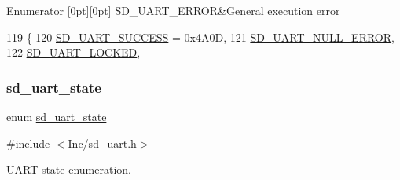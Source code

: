 \begin{DoxyEnumFields}{Enumerator}
[0pt][0pt]{}\mbox{\label{group___s_d___u_a_r_t___types_ggaff649a266fb34035c10733370c4fd104ad77d98472c0c3bb192d745b3389de08d}} 
S\+D\+\_\+\+U\+A\+R\+T\+\_\+\+E\+R\+R\+OR&General execution error \\
\hline

\end{DoxyEnumFields}

\begin{DoxyCode}
119                  \{
120     \mbox{\hyperlink{group___s_d___u_a_r_t___types_ggaff649a266fb34035c10733370c4fd104a3b6fe085405a5d58c55226fd59f01994}{SD\_UART\_SUCCESS}} = 0x4A0D,        
121     \mbox{\hyperlink{group___s_d___u_a_r_t___types_ggaff649a266fb34035c10733370c4fd104a5c517833fd066aef16573f7c2b2074d7}{SD\_UART\_NULL\_ERROR}},           
122     \mbox{\hyperlink{group___s_d___u_a_r_t___types_ggaff649a266fb34035c10733370c4fd104a81ad9d26004338f6c20d9a1ed5232662}{SD\_UART\_LOCKED}},               
\end{DoxyCode}
\mbox{\label{group___s_d___u_a_r_t___types_gaf0b8536f812b898a674880b74843b6da}} 
\subsubsection{\texorpdfstring{sd\+\_\+uart\+\_\+state}{sd\_uart\_state}}
{\footnotesize\ttfamily enum \mbox{\hyperlink{group___s_d___u_a_r_t___types_gaf0b8536f812b898a674880b74843b6da}{sd\+\_\+uart\+\_\+state}}}



{\ttfamily \#include $<$\mbox{\hyperlink{sd__uart_8h}{Inc/sd\+\_\+uart.\+h}}$>$}



U\+A\+RT state enumeration. 


